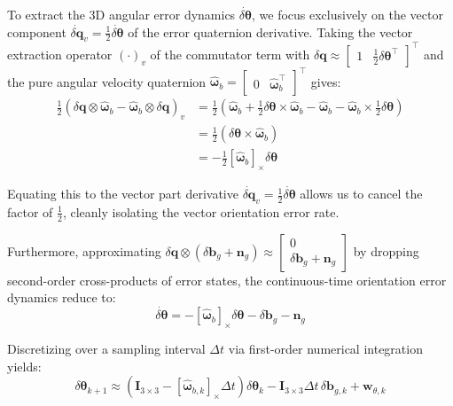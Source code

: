 \documentclass{article}
\begin{document}
	To extract the 3D angular error dynamics $\dot{\delta\bm{\theta}}$, we focus exclusively on the vector component $\dot{\delta\mathbf{q}}_v = \frac{1}{2}\dot{\delta\bm{\theta}}$ of the error quaternion derivative. Taking the vector extraction operator $(\cdot)_v$ of the commutator term with $\delta\mathbf{q} \approx \begin{bmatrix} 1 & \frac{1}{2}\delta\bm{\theta}^\top \end{bmatrix}^\top$ and the pure angular velocity quaternion $\hat{\bm{\omega}}_b = \begin{bmatrix} 0 & \hat{\bm{\omega}}_b^\top \end{bmatrix}^\top$ gives:
	\begin{align*}
		\frac{1}{2} \left( \delta\mathbf{q} \otimes \hat{\bm{\omega}}_b - \hat{\bm{\omega}}_b \otimes \delta\mathbf{q} \right)_v &= \frac{1}{2} \left( \hat{\bm{\omega}}_b + \frac{1}{2}\delta\bm{\theta} \times \hat{\bm{\omega}}_b - \hat{\bm{\omega}}_b - \hat{\bm{\omega}}_b \times \frac{1}{2}\delta\bm{\theta} \right) \\
		&= \frac{1}{2} \left( \delta\bm{\theta} \times \hat{\bm{\omega}}_b \right) \\
		&= -\frac{1}{2} [\hat{\bm{\omega}}_b]_\times \delta\bm{\theta}
	\end{align*}
	
	Equating this to the vector part derivative $\dot{\delta\mathbf{q}}_v = \frac{1}{2}\dot{\delta\bm{\theta}}$ allows us to cancel the factor of $\frac{1}{2}$, cleanly isolating the vector orientation error rate.
	
	Furthermore, approximating $\delta\mathbf{q} \otimes (\delta\mathbf{b}_g + \mathbf{n}_g) \approx \begin{bmatrix} 0 \\ \delta\mathbf{b}_g + \mathbf{n}_g \end{bmatrix}$ by dropping second-order cross-products of error states, the continuous-time orientation error dynamics reduce to:
	\begin{equation*}
		\dot{\delta\bm{\theta}} = -[\hat{\bm{\omega}}_b]_\times \delta\bm{\theta} - \delta\mathbf{b}_g - \mathbf{n}_g
	\end{equation*}
	
	Discretizing over a sampling interval $\Delta t$ via first-order numerical integration yields:
	\begin{equation*}
		\delta\bm{\theta}_{k+1} \approx \left( \mathbf{I}_{3 \times 3} - [\hat{\bm{\omega}}_{b,k}]_\times \Delta t \right) \delta\bm{\theta}_k - \mathbf{I}_{3 \times 3} \Delta t \, \delta\mathbf{b}_{g,k} + \mathbf{w}_{\theta,k}
	\end{equation*}
	
\end{document}

